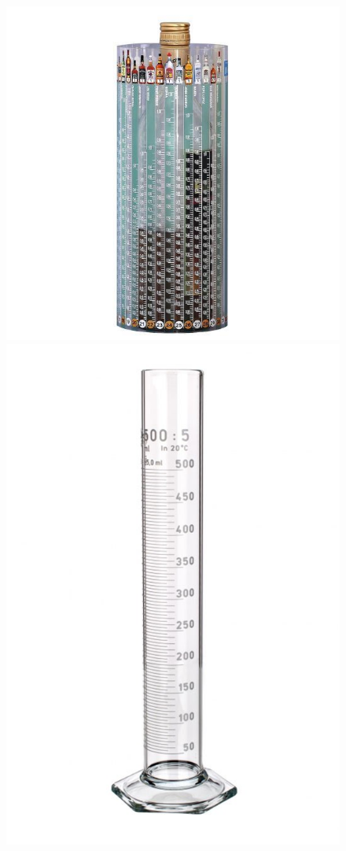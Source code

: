 \begin{figure}[H]
    \begin{center}
        \includegraphics[scale=0.35]{obrazky/odměrný válec na alkohol.jpg}
        \includegraphics[scale=0.33]{obrazky/odměrný válec.jpg}

\end{center}
\end{figure}
